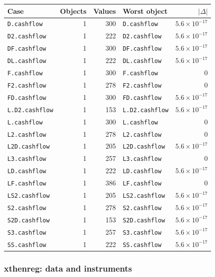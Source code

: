 \begin{longtable}{@{}p{3.6cm}rrp{4.9cm}r@{}}
\toprule
Case & Objects & Values & Worst object & $|\Delta|$ \\
\midrule
\endhead
\texttt{D.cashflow} & 1 & 300 & \texttt{D.cashflow} & $5.6\times10^{-17}$ \\
\texttt{D2.cashflow} & 1 & 222 & \texttt{D2.cashflow} & $5.6\times10^{-17}$ \\
\texttt{DF.cashflow} & 1 & 300 & \texttt{DF.cashflow} & $5.6\times10^{-17}$ \\
\texttt{DL.cashflow} & 1 & 222 & \texttt{DL.cashflow} & $5.6\times10^{-17}$ \\
\texttt{F.cashflow} & 1 & 300 & \texttt{F.cashflow} & 0 \\
\texttt{F2.cashflow} & 1 & 278 & \texttt{F2.cashflow} & 0 \\
\texttt{FD.cashflow} & 1 & 300 & \texttt{FD.cashflow} & $5.6\times10^{-17}$ \\
\texttt{L.D2.cashflow} & 1 & 153 & \texttt{L.D2.cashflow} & $5.6\times10^{-17}$ \\
\texttt{L.cashflow} & 1 & 300 & \texttt{L.cashflow} & 0 \\
\texttt{L2.cashflow} & 1 & 278 & \texttt{L2.cashflow} & 0 \\
\texttt{L2D.cashflow} & 1 & 205 & \texttt{L2D.cashflow} & $5.6\times10^{-17}$ \\
\texttt{L3.cashflow} & 1 & 257 & \texttt{L3.cashflow} & 0 \\
\texttt{LD.cashflow} & 1 & 222 & \texttt{LD.cashflow} & $5.6\times10^{-17}$ \\
\texttt{LF.cashflow} & 1 & 386 & \texttt{LF.cashflow} & 0 \\
\texttt{LS2.cashflow} & 1 & 205 & \texttt{LS2.cashflow} & $5.6\times10^{-17}$ \\
\texttt{S2.cashflow} & 1 & 278 & \texttt{S2.cashflow} & $5.6\times10^{-17}$ \\
\texttt{S2D.cashflow} & 1 & 153 & \texttt{S2D.cashflow} & $5.6\times10^{-17}$ \\
\texttt{S3.cashflow} & 1 & 257 & \texttt{S3.cashflow} & $5.6\times10^{-17}$ \\
\texttt{SS.cashflow} & 1 & 222 & \texttt{SS.cashflow} & $5.6\times10^{-17}$ \\
\bottomrule
\end{longtable}

\subsubsection*{xthenreg: data and instruments}

